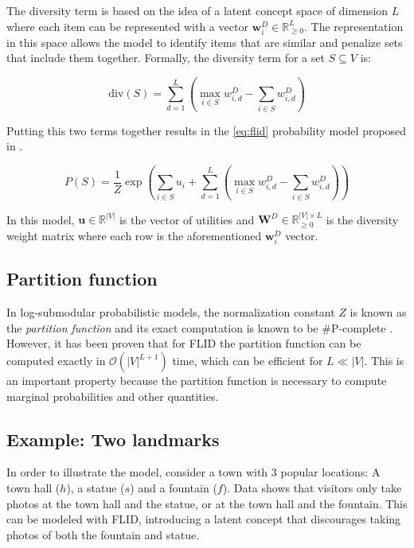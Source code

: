 The diversity term is based on the idea of a latent concept space of dimension $L$ where each item can be represented with a vector $\mathbf{w}^{D}_{i} \in \mathbb{R}^{L}_{\geq 0}$. The representation in this space allows the model to identify items that are similar and penalize sets that include them together. Formally, the diversity term for a set $S \subseteq V$ is:

\begin{equation}
  \label{eq:diversity}
  \mathrm{div}(S) = \sum_{d=1}^{L}\left(\max_{i \in S}{w^{D}_{i, d}} - \sum_{i \in S}{w^{D}_{i,d}}\right)
\end{equation}

Putting this two terms together results in the \ref{eq:flid} probability model proposed in \cite{tschiatschek16learning}.

\begin{equation}
  \tag{FLID}
  P(S) = \frac{1}{Z}\exp{\left(\sum_{i \in S}u_{i} + \sum_{d=1}^{L}\left(\max_{i \in S}{w^{D}_{i, d}} - \sum_{i \in S}{w^{D}_{i,d}}\right)\right)}
  \label{eq:flid}
\end{equation}

In this model, $\mathbf{u} \in \mathbb{R}^{|V|}$ is the vector of utilities and $\mathbf{W}^{D} \in \mathbb{R}_{\geq 0}^{|V| \times L}$ is the diversity weight matrix where each row is the aforementioned $\mathbf{w}^{D}_{i}$ vector.

\subsection{Partition function}

In log-submodular probabilistic models, the normalization constant $Z$ is known as the \textit{partition function} \cite{djolonga14variational} and its exact computation is known to be \#P-complete \cite{jerrum1990}.  However, it has been proven \cite{tschiatschek16learning} that for FLID the partition function can be computed exactly in $\mathcal{O}(|V|^{L+1})$ time, which can be efficient for $L \ll |V|$. This is an important property because the partition function is necessary to compute marginal probabilities and other quantities.

\subsection{Example: Two landmarks}
\label{sec:flid-toy}

In order to illustrate the model, consider a town with 3 popular locations: A town hall ($h$), a statue ($s$) and a fountain ($f$). Data shows that visitors only take photos at the town hall and the statue, or at the town hall and the fountain. This can be modeled with FLID, introducing a latent concept that discourages taking photos of both the fountain and statue.

